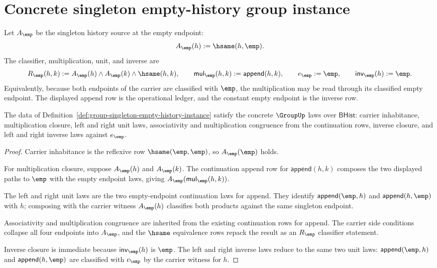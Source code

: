 \section{Concrete singleton empty-history group instance}
\label{sec:group-concrete-singleton-empty-history-instance}

\begin{definition}
\label{def:group-singleton-empty-history-instance}
Let $A_{\emp}$ be the singleton history source at the empty endpoint:
$$
A_{\emp}(h) := \hsame(h,\emp).
$$
The classifier, multiplication, unit, and inverse are
$$
R_{\emp}(h,k) := A_{\emp}(h)\land A_{\emp}(k)\land \hsame(h,k),
\qquad
\mathsf{mul}_{\emp}(h,k):=\mathsf{append}(h,k),
\qquad
e_{\emp}:=\emp,
\qquad
\mathsf{inv}_{\emp}(h):=\emp.
$$
Equivalently, because both endpoints of the carrier are classified with
$\emp$, the multiplication may be read through its classified empty endpoint.
The displayed append row is the operational ledger, and the constant empty
endpoint is the inverse row.
\end{definition}

\begin{theorem}
\label{thm:group-singleton-empty-history-laws}
The data of Definition~\ref{def:group-singleton-empty-history-instance}
satisfy the concrete $\GroupUp$ laws over $\mathsf{BHist}$: carrier
inhabitance, multiplication closure, left and right unit laws, associativity
and multiplication congruence from the continuation rows, inverse closure, and
left and right inverse laws against $e_{\emp}$.
\end{theorem}
\begin{proof}
Carrier inhabitance is the reflexive row $\hsame(\emp,\emp)$, so
$A_{\emp}(\emp)$ holds.

For multiplication closure, suppose $A_{\emp}(h)$ and $A_{\emp}(k)$. The
continuation append row for $\mathsf{append}(h,k)$ composes the two displayed
paths to $\emp$ with the empty endpoint laws, giving
$A_{\emp}(\mathsf{mul}_{\emp}(h,k))$.

The left and right unit laws are the two empty-endpoint continuation laws for
append. They identify $\mathsf{append}(\emp,h)$ and
$\mathsf{append}(h,\emp)$ with $h$; composing with the carrier witness
$A_{\emp}(h)$ classifies both products against the same singleton endpoint.

Associativity and multiplication congruence are inherited from the existing
continuation rows for append. The carrier side conditions collapse all four
endpoints into $A_{\emp}$, and the $\hsame$ equivalence rows repack the result
as an $R_{\emp}$ classifier statement.

Inverse closure is immediate because $\mathsf{inv}_{\emp}(h)$ is $\emp$. The
left and right inverse laws reduce to the same two unit laws:
$\mathsf{append}(\emp,h)$ and $\mathsf{append}(h,\emp)$ are classified with
$e_{\emp}$ by the carrier witness for $h$.
\end{proof}

